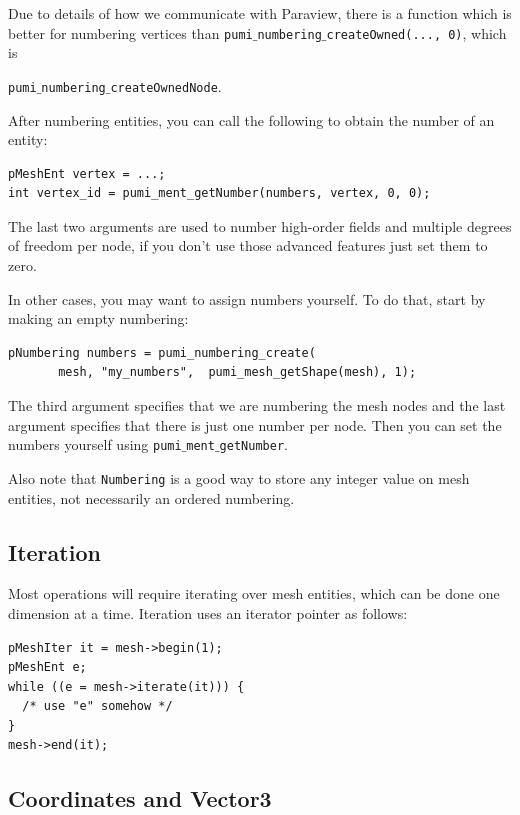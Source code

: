 \documentclass{article}
\begin{document}
Due to details of how we communicate with Paraview, there is a
function which is better for numbering vertices than
\texttt{pumi$\_$numbering$\_$createOwned(..., 0)}, which is {\texttt{pumi$\_$numbering$\_$createOwnedNode}.

After numbering entities, you can call the following to obtain the number of an
entity:

\begin{lstlisting}
pMeshEnt vertex = ...;
int vertex_id = pumi_ment_getNumber(numbers, vertex, 0, 0);
\end{lstlisting}

The last two arguments are used to number high-order fields and
multiple degrees of freedom per node, if you don't use those
advanced features just set them to zero.

In other cases, you may want to assign numbers yourself.
To do that, start by making an empty numbering:

\begin{lstlisting}
pNumbering numbers = pumi_numbering_create(
       mesh, "my_numbers",  pumi_mesh_getShape(mesh), 1);
\end{lstlisting}

The third argument specifies that we are numbering the mesh
nodes and the last argument specifies that there is just one
number per node.
Then you can set the numbers yourself using \texttt{pumi$\_$ment$\_$getNumber}.

Also note that \texttt{Numbering} is a good way to store
any integer value on mesh entities, not necessarily an
ordered numbering.

\subsection{Iteration}

Most operations will require iterating over mesh entities,
which can be done one dimension at a time.
Iteration uses an iterator pointer as follows:

\begin{lstlisting}
pMeshIter it = mesh->begin(1);
pMeshEnt e;
while ((e = mesh->iterate(it))) {
  /* use "e" somehow */
}
mesh->end(it);
\end{lstlisting}

\subsection{Coordinates and Vector3}

}
\end{document}
